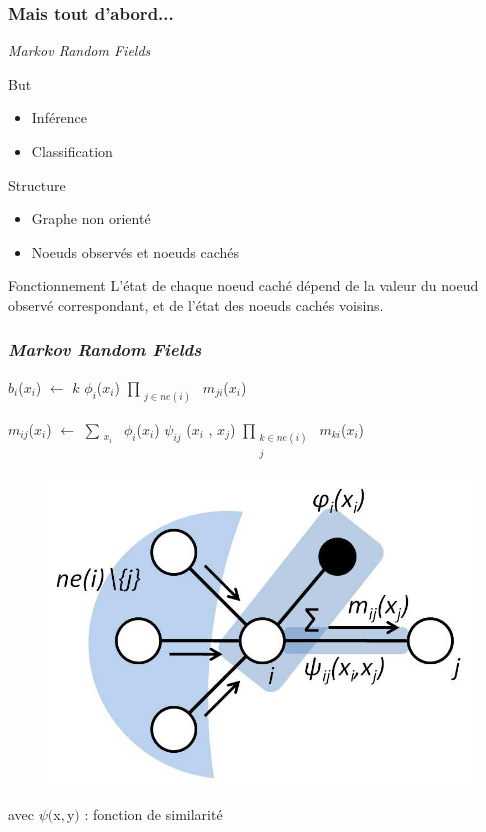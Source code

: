 \documentclass[12pt]{beamer}
\begin{document}
\begin{frame}
  \frametitle{Mais tout d'abord...}
  \textit{Markov Random Fields}
  \begin{block}{But}
  \begin{itemize}
   \item Inférence
   \item Classification
  \end{itemize}
  \end{block}
  
  \begin{block}{Structure}
  \begin{itemize}
   \item Graphe non orienté
   \item Noeuds observés et noeuds cachés
  \end{itemize}
  \end{block}
  
  \begin{block}{Fonctionnement}
  L'état de chaque noeud caché dépend de la valeur du noeud observé correspondant,
  et de l'état des noeuds cachés voisins.
  \end{block}
\end{frame}

\begin{frame}
  \frametitle{\textit{Markov Random Fields}}
  
  $b_i$($x_i$) $\leftarrow$ $k$ $\phi_i$($x_i$) $\prod_{\substack{j \in ne(i)}}$ $m_{ji}$($x_i$)
  \linebreak
  
  $m_{ij}$($x_i$) $\leftarrow$ $\sum_{\substack{x_i}}$ $\phi_i$($x_i$) $\psi_{ij}$ ($x_i$ , $x_j$) $\prod_{\substack{k \in ne(i) \\ j}}$ $m_{ki}$($x_i$)
  
  \begin{figure}[h]
  \centering
  \includegraphics[scale=0.2]{schemaMRF.png}
  \end{figure}
  
  avec $\psi($x$,$y$)$ : fonction de similarité
\end{frame}
\end{document}
